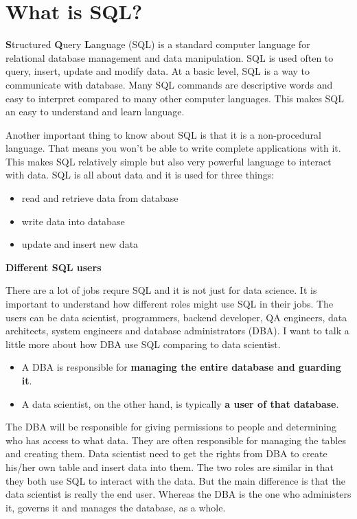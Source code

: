 \documentclass[]{book}
\providecommand{\tightlist}{%
  \setlength{\itemsep}{0pt}\setlength{\parskip}{0pt}}
\theoremstyle{definition}
\theoremstyle{definition}
\theoremstyle{remark}
\begin{document}
\section{What is SQL?}\label{what-is-sql}

\textbf{S}tructured \textbf{Q}uery \textbf{L}anguage (SQL) is a standard
computer language for relational database management and data
manipulation. SQL is used often to query, insert, update and modify
data. At a basic level, SQL is a way to communicate with database. Many
SQL commands are descriptive words and easy to interpret compared to
many other computer languages. This makes SQL an easy to understand and
learn language.

Another important thing to know about SQL is that it is a non-procedural
language. That means you won't be able to write complete applications
with it. This makes SQL relatively simple but also very powerful
language to interact with data. SQL is all about data and it is used for
three things:

\begin{itemize}
\tightlist
\item
  read and retrieve data from database
\item
  write data into database
\item
  update and insert new data
\end{itemize}

\textbf{Different SQL users}

There are a lot of jobs requre SQL and it is not just for data science.
It is important to understand how different roles might use SQL in their
jobs. The users can be data scientist, programmers, backend developer,
QA engineers, data architects, system engineers and database
administrators (DBA). I want to talk a little more about how DBA use SQL
comparing to data scientist.

\begin{itemize}
\tightlist
\item
  A DBA is responsible for \textbf{managing the entire database and
  guarding it}.
\item
  A data scientist, on the other hand, is typically \textbf{a user of
  that database}.
\end{itemize}

The DBA will be responsible for giving permissions to people and
determining who has access to what data. They are often responsible for
managing the tables and creating them. Data scientist need to get the
rights from DBA to create his/her own table and insert data into them.
The two roles are similar in that they both use SQL to interact with the
data. But the main difference is that the data scientist is really the
end user. Whereas the DBA is the one who administers it, governs it and
manages the database, as a whole.
\end{document}
